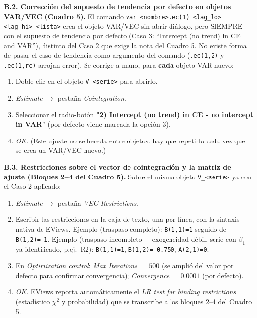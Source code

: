 \documentclass[12pt, letterpaper]{article}
\begin{document}
\textbf{B.2. Corrección del supuesto de tendencia por defecto en
objetos VAR/VEC (Cuadro 5).} El comando
\lstinline{var <nombre>.ec(1) <lag_lo> <lag_hi> <lista>} crea el
objeto VAR/VEC sin abrir diálogo, pero SIEMPRE con el supuesto de
tendencia por defecto (Caso 3: ``Intercept (no trend) in CE and VAR''),
distinto del Caso 2 que exige la nota del Cuadro 5. No existe forma de
pasar el caso de tendencia como argumento del comando
(\lstinline{.ec(1,2)} y \lstinline{.ec(1,rc)} arrojan error). Se
corrige a mano, para \textbf{cada} objeto VAR nuevo:
\begin{enumerate}
  \item Doble clic en el objeto \texttt{V\_<serie>} para abrirlo.
  \item \textit{Estimate} $\to$ pestaña \textit{Cointegration}.
  \item Seleccionar el radio-botón \textbf{"2) Intercept (no trend)
        in CE - no intercept in VAR"} (por defecto viene marcada la
        opción 3).
  \item \textit{OK}. (Este ajuste no se hereda entre objetos: hay que
        repetirlo cada vez que se crea un VAR/VEC nuevo.)
\end{enumerate}

\textbf{B.3. Restricciones sobre el vector de cointegración y la
matriz de ajuste (Bloques 2--4 del Cuadro 5).} Sobre el mismo objeto
\texttt{V\_<serie>} ya con el Caso 2 aplicado:
\begin{enumerate}
  \item \textit{Estimate} $\to$ pestaña \textit{VEC Restrictions}.
  \item Escribir las restricciones en la caja de texto, una por línea,
        con la sintaxis nativa de EViews. Ejemplo (traspaso completo):
        \lstinline{B(1,1)=1} seguido de \lstinline{B(1,2)=-1}.
        Ejemplo (traspaso incompleto + exogeneidad débil, serie con
        $\beta_1$ ya identificado, p.ej.\ R2): \lstinline{B(1,1)=1},
        \lstinline{B(1,2)=-0.750}, \lstinline{A(2,1)=0}.
  \item En \textit{Optimization control}: \textit{Max Iterations}
        $=500$ (se amplió del valor por defecto para confirmar
        convergencia); \textit{Convergence} $=0.0001$ (por defecto).
  \item \textit{OK}. EViews reporta automáticamente el \textit{LR test
        for binding restrictions} (estadístico $\chi^2$ y
        probabilidad) que se transcribe a los bloques 2--4 del
        Cuadro 5.
\end{enumerate}
\end{document}
